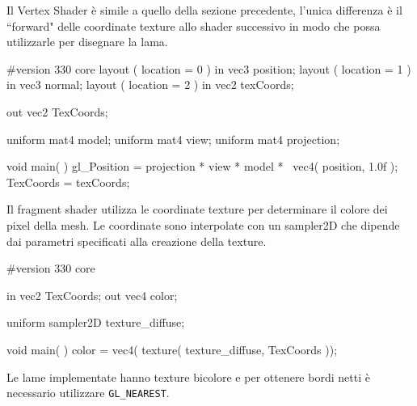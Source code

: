 Il Vertex Shader è simile a quello della sezione precedente, l'unica differenza è il ``forward" delle coordinate texture allo shader successivo in modo che possa utilizzarle per disegnare la lama.
\begin{cpp}[caption={Codice sorgente del Vertex Shader. Applica la trasformazione a tutti i vertici del modello e ritorna le coordinate texture.}, captionpos=t]
 #version 330 core
 layout ( location = 0 ) in vec3 position;
 layout ( location = 1 ) in vec3 normal;
 layout ( location = 2 ) in vec2 texCoords;
 
 out vec2 TexCoords;
 
 uniform mat4 model;
 uniform mat4 view;
 uniform mat4 projection;
 
 void main( )
 {
 	gl_Position = projection * view * model * \ 
 	              vec4( position, 1.0f );
 	TexCoords = texCoords;
 }
\end{cpp}



Il fragment shader utilizza le coordinate texture per determinare il colore dei pixel della mesh. Le coordinate sono interpolate con un sampler2D che dipende dai parametri specificati alla creazione della texture. 
\begin{cpp}[caption={Codice sorgente del Fragment Shader.}, captionpos=t]
 #version 330 core
 
 in vec2 TexCoords;
 out vec4 color;
 
 uniform sampler2D texture_diffuse;
 
 void main( )
 {
 	color = vec4( texture( texture_diffuse, TexCoords ));
 }
\end{cpp}

Le lame implementate hanno texture bicolore e per ottenere bordi netti è necessario utilizzare \texttt{GL\_NEAREST}.

